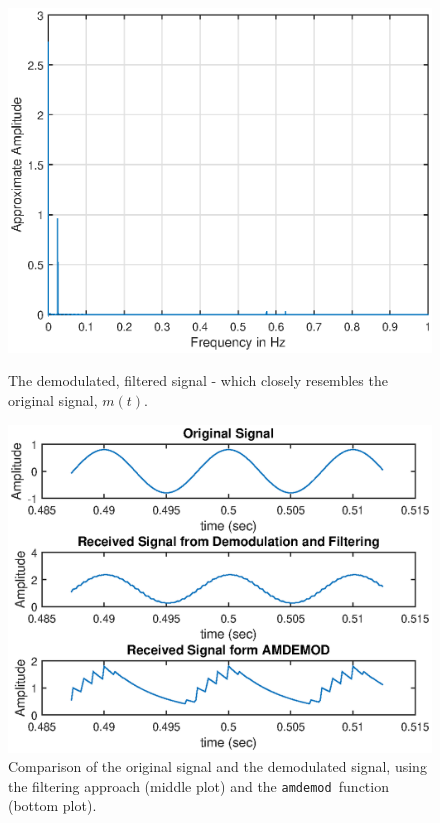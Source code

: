 \documentclass{article}
\begin{document}
\begin{figure}[H]
	\begin{minipage}[t]{0.45\linewidth}
		\centering
		\includegraphics[scale=0.5]{fig9.eps}
		\caption{The demodulated, filtered signal - which closely resembles the original signal, $m(t)$.}
	\end{minipage}
	\hspace{1cm}
	\begin{minipage}[t]{0.45\linewidth}
		\centering
		\includegraphics[scale=0.5]{fig10.eps}
		\cprotect\caption{Comparison of the original signal and the demodulated signal, using the filtering approach (middle plot) and the \verb|amdemod |function (bottom plot).}
	\end{minipage}
\end{figure}
\end{document}
